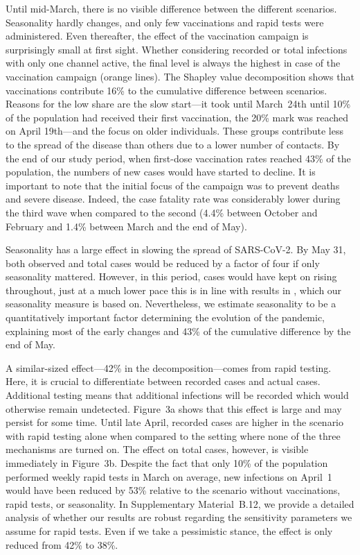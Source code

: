 \documentclass[fleqn,10pt]{wlscirep}
\begin{document}
Until mid-March, there is no visible difference between the different scenarios.
Seasonality hardly changes, and only few vaccinations and rapid tests were administered.
Even thereafter, the effect of the vaccination campaign is surprisingly small at first
sight. Whether considering recorded or total infections with only one channel active,
the final level is always the highest in case of the vaccination campaign (orange
lines). The Shapley value decomposition shows that vaccinations contribute 16\% to the
cumulative difference between scenarios. Reasons for the low share are the slow
start---it took until March~24th until 10\% of the population had received their first
vaccination, the 20\% mark was reached on April 19th---and the focus on older
individuals. These groups contribute less to the spread of the disease than others due
to a lower number of contacts. By the end of our study period, when first-dose
vaccination rates reached 43\% of the population, the numbers of new cases would have
started to decline. It is important to note that the initial focus of the campaign was
to prevent deaths and severe disease. Indeed, the case fatality rate was considerably
lower during the third wave when compared to the second (4.4\% between October and
February and 1.4\% between March and the end of May).

Seasonality has a large effect in slowing the spread of SARS-CoV-2. By May 31, both
observed and total cases would be reduced by a factor of four if only seasonality
mattered. However, in this period, cases would have kept on rising throughout, just at a
much lower pace this is in line with results in \cite{Gavenciak2021}, which our
seasonality measure is based on. Nevertheless, we estimate seasonality to be a
quantitatively important factor determining the evolution of the pandemic, explaining
most of the early changes and 43\% of the cumulative difference by the end of May.

A similar-sized effect---42\% in the decomposition---comes from rapid testing. Here, it
is crucial to differentiate between recorded cases and actual cases. Additional testing
means that additional infections will be recorded which would otherwise remain
undetected. Figure~3a shows that this effect is large and may persist for some time.
Until late April, recorded cases are higher in the scenario with rapid testing alone
when compared to the setting where none of the three mechanisms are turned on. The
effect on total cases, however, is visible immediately in Figure~3b. Despite the fact
that only 10\% of the population performed weekly rapid tests in March on average, new
infections on April~1 would have been reduced by 53\% relative to the scenario without
vaccinations, rapid tests, or seasonality. In Supplementary Material~B.12, we provide a
detailed analysis of whether our results are robust regarding the sensitivity parameters
we assume for rapid tests. Even if we take a pessimistic stance, the effect is only
reduced from 42\% to 38\%.
\end{document}
